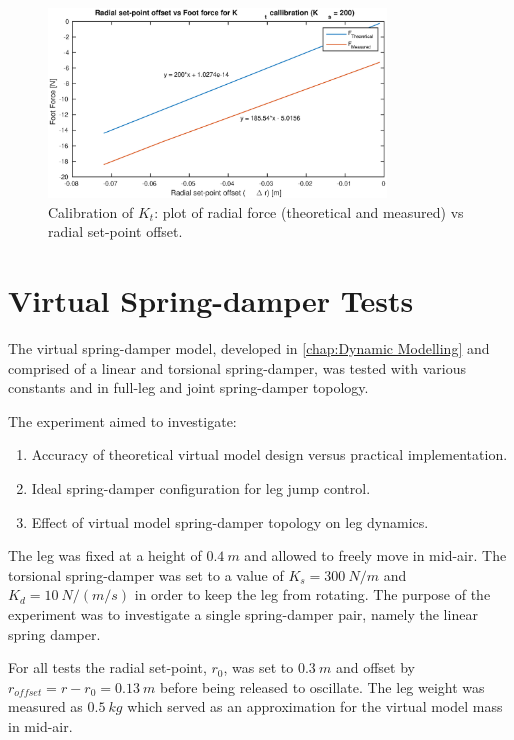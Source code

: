 \begin{figure}
\centering
\includegraphics[width=0.8\textwidth]{images/experiments/kt-callibration-measured.eps} 
\caption{Calibration of $K_t$: plot of radial force (theoretical and measured) vs radial set-point offset.}
\label{fig:kt-callibration-measured}
\end{figure}

\section{Virtual Spring-damper Tests} 
\label{sec:Virtual Spring-damper Tests}

The virtual spring-damper model, developed in \cref{chap:Dynamic Modelling} and comprised of a linear and torsional spring-damper, was tested with various constants and in full-leg and joint spring-damper topology.

The experiment aimed to investigate:

\begin{enumerate}
\item Accuracy of theoretical virtual model design versus practical implementation.
\item Ideal spring-damper configuration for leg jump control.
\item Effect of virtual model spring-damper topology on leg dynamics.
\end{enumerate}

The leg was fixed at a height of $0.4\ m$ and allowed to freely move in mid-air. The torsional spring-damper was set to a value of $K_s = 300\ N/m$ and $K_d = 10\ N/(m/s)$ in order to keep the leg from rotating. The purpose of the experiment was to investigate a single spring-damper pair, namely the linear spring damper.

For all tests the radial set-point, $r_0$, was set to $0.3\ m$ and offset by $r_{offset} = r - r_0 = 0.13\ m$ before being released to oscillate. The leg weight was measured as $0.5\ kg$ which served as an approximation for the virtual model mass in mid-air.

